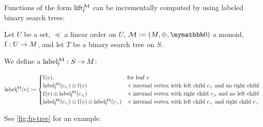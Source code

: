 Functions of the form $\operatorname{lift_{\operatorname{f}}^{\mathcal{M}}}$ can be incrementally computed by using labeled binary search trees:

\begin{definition}
Let $U$ be a set, $\preceq$ a linear order on $U$, $\mathcal{M} \defeq (M, \groupaddsym, \neutraladd)$ a monoid, ${\operatorname{f}}: {U} \rightarrow {M}$, and let $T$ be a binary search tree on $S$.

We define a  ${\operatorname{label_{\operatorname{f}}^{\mathcal{M}}}}: {S} \rightarrow {M}$:


  \[
   \operatorname{label_{\operatorname{f}}^{\mathcal{M}}}(v) \vcentcolon= \begin{cases}
\operatorname{f}(v), &  \text{for leaf $v$} \\
{\operatorname{label_{\operatorname{f}}^{\mathcal{M}}}(c_{<})} \oplus {\operatorname{f}(v)} & \, \text{v internal vertex with left child $c_{<}$ and no right child}\\
{\operatorname{f}(v)} \oplus {\operatorname{label_{\operatorname{f}}^{\mathcal{M}}}(c_{<})} & \, \text{v internal vertex with right child $c_{>}$ and no left child}\\
{\operatorname{label_{\operatorname{f}}^{\mathcal{M}}}(c_{<})} \oplus {{\operatorname{f}(v)} \oplus{\operatorname{label_{\operatorname{f}}^{\mathcal{M}}}(c_{>})}} & \, \text{v internal vertex with left child $c_{<}$ and right child $c_{>}$}
\end{cases}
  \]

See \cref{fig:fp-tree} for an example.
\end{definition}

